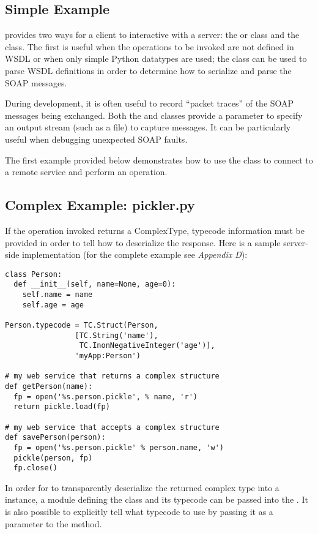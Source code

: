 \subsection{Simple Example}
\ZSI{} provides two ways for a client to interactive with a server:
the  or  class and the
 class.  The first is useful when the operations to be
invoked are not defined in WSDL or when only simple Python datatypes are used;
the  class can be used to parse WSDL definitions in order
to determine how to serialize and parse the SOAP messages.

During development, it is often useful to record ``packet traces'' of
the SOAP messages being exchanged.  Both the  and
 classes provide a  parameter to specify an
output stream (such as a file) to capture messages.  It can be particularly
useful when debugging unexpected SOAP faults.

The first example provided below demonstrates how to use the 
class to connect to a remote service and perform an operation.



\subsection{Complex Example: pickler.py}
If the operation invoked returns a ComplexType, typecode information must
be provided in order to tell \ZSI{} how to deserialize the response.
Here is a sample server-side implementation (for the complete example see
\emph{Appendix D}):

\begin{verbatim}
class Person:
  def __init__(self, name=None, age=0):
    self.name = name
    self.age = age

Person.typecode = TC.Struct(Person,
			    [TC.String('name'),
			     TC.InonNegativeInteger('age')],
			    'myApp:Person')

# my web service that returns a complex structure
def getPerson(name):
  fp = open('%s.person.pickle', % name, 'r')
  return pickle.load(fp)

# my web service that accepts a complex structure
def savePerson(person):
  fp = open('%s.person.pickle' % person.name, 'w')
  pickle(person, fp)
  fp.close()
\end{verbatim}

In order for \ZSI{} to transparently deserialize the returned complex type into
a  instance, a module defining the class and its typecode can be
passed into the . It is also possible to explicitly tell \ZSI{} 
what typecode to use by passing it as a parameter to the  
method.  

